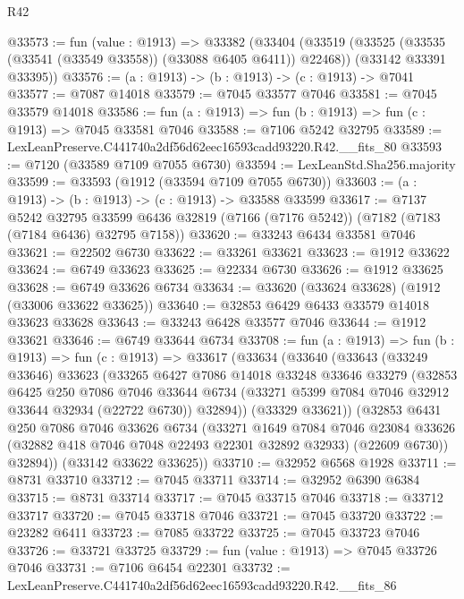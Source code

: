 \begin{lexlean}{R42}
\begin{coremodule}
{@33573 := fun (value : @1913) =>
  @33382
    (@33404
      (@33519 (@33525 (@33535 (@33541 (@33549 @33558)) (@33088 @6405 @6411)) @22468))
      (@33142 @33391 @33395))
@33576 := (a : @1913) -> (b : @1913) -> (c : @1913) -> @7041
@33577 := @7087 @14018
@33579 := @7045 @33577 @7046
@33581 := @7045 @33579 @14018
@33586 := fun (a : @1913) => fun (b : @1913) => fun (c : @1913) => @7045 @33581 @7046
@33588 := @7106 @5242 @32795
@33589 := LexLeanPreserve.C441740a2df56d62eec16593cadd93220.R42.__fits_80
@33593 := @7120 (@33589 @7109 @7055 @6730)
@33594 := LexLeanStd.Sha256.majority
@33599 := @33593 (@1912 (@33594 @7109 @7055 @6730))
@33603 := (a : @1913) -> (b : @1913) -> (c : @1913) -> @33588 @33599
@33617 := @7137
    @5242
    @32795
    @33599
    @6436
    @32819
    (@7166 (@7176 @5242))
    (@7182 (@7183 (@7184 @6436) @32795 @7158))
@33620 := @33243 @6434 @33581 @7046
@33621 := @22502 @6730
@33622 := @33261 @33621
@33623 := @1912 @33622
@33624 := @6749 @33623
@33625 := @22334 @6730
@33626 := @1912 @33625
@33628 := @6749 @33626 @6734
@33634 := @33620 (@33624 @33628) (@1912 (@33006 @33622 @33625))
@33640 := @32853 @6429 @6433 @33579 @14018 @33623 @33628
@33643 := @33243 @6428 @33577 @7046
@33644 := @1912 @33621
@33646 := @6749 @33644 @6734
@33708 := fun (a : @1913) =>
  fun (b : @1913) =>
  fun (c : @1913) =>
  @33617
    (@33634
      (@33640
        (@33643
          (@33249 @33646)
          @33623
          (@33265
            @6427
            @7086
            @14018
            @33248
            @33646
            @33279
            (@32853
              @6425
              @250
              @7086
              @7046
              @33644
              @6734
              (@33271 @5399 @7084 @7046 @32912 @33644 @32934 (@22722 @6730))
              @32894))
          (@33329 @33621))
        (@32853
          @6431
          @250
          @7086
          @7046
          @33626
          @6734
          (@33271
            @1649
            @7084
            @7046
            @23084
            @33626
            (@32882 @418 @7046 @7048 @22493 @22301 @32892 @32933)
            (@22609 @6730))
          @32894))
      (@33142 @33622 @33625))
@33710 := @32952 @6568 @1928
@33711 := @8731 @33710
@33712 := @7045 @33711
@33714 := @32952 @6390 @6384
@33715 := @8731 @33714
@33717 := @7045 @33715 @7046
@33718 := @33712 @33717
@33720 := @7045 @33718 @7046
@33721 := @7045 @33720
@33722 := @23282 @6411
@33723 := @7085 @33722
@33725 := @7045 @33723 @7046
@33726 := @33721 @33725
@33729 := fun (value : @1913) => @7045 @33726 @7046
@33731 := @7106 @6454 @22301
@33732 := LexLeanPreserve.C441740a2df56d62eec16593cadd93220.R42.__fits_86
}
\end{coremodule}
\end{lexlean}
